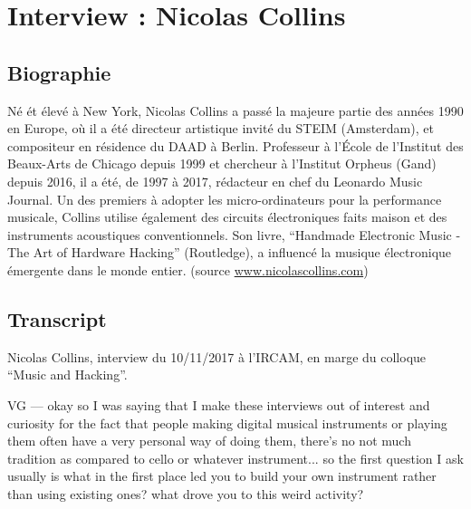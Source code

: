 \chapter{Interview : Nicolas Collins}
\label{appendix:collins}

\section*{Biographie}

\noindent Né ét élevé à New York, Nicolas Collins a passé la majeure partie des années 1990 en Europe, où il a été directeur artistique invité du \gls{STEIM} (Amsterdam), et compositeur en résidence du DAAD à Berlin. Professeur à l'École de l'Institut des Beaux-Arts de Chicago depuis 1999 et chercheur à l'Institut Orpheus (Gand) depuis 2016, il a été, de 1997 à 2017, rédacteur en chef du Leonardo Music Journal. Un des premiers à adopter les micro-ordinateurs pour la performance musicale, Collins utilise également des circuits électroniques faits maison et des instruments acoustiques conventionnels. Son livre, ``Handmade Electronic Music - The Art of Hardware Hacking'' (Routledge), a influencé la musique électronique émergente dans le monde entier. (source \url{www.nicolascollins.com})

\section*{Transcript}

\noindent Nicolas Collins, interview du 10/11/2017 à l'IRCAM, en marge du colloque ``Music and Hacking''.

VG — okay so I was saying that I make these interviews out of interest and curiosity for the fact that people making digital musical instruments or  playing them often have a very personal way of doing them, there's no not much tradition as compared to cello or whatever instrument... so the first question I ask usually is what in the first place led you to build your own instrument rather than using existing ones? what drove you to this weird activity?

